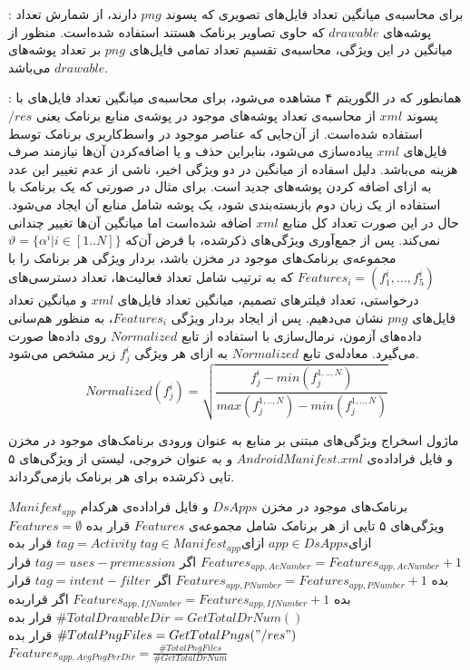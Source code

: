 : برای محاسبه‌ی میانگین تعداد فایل‌های تصویری که پسوند $png$ دارند، از شمارش تعداد پوشه‌های $drawable$ که حاوی تصاویر برنامک هستند استفاده شده‌است. منظور از میانگین در این ویژگی، محاسبه‌ی تقسیم تعداد تمامی فایل‌های $png$ بر تعداد پوشه‌های $drawable$ می‌باشد.

:  همانطور که در الگوریتم ۴ مشاهده می‌شود، برای محاسبه‌ی میانگین تعداد فایل‌های با پسوند $xml$ از محاسبه‌ی تعداد پوشه‌های موجود در پوشه‌ی منابع برنامک یعنی $/res$ استفاده شده‌است. از آن‌جایی که عناصر موجود در واسط‌کاربری برنامک توسط فایل‌های $xml$ پیاده‌سازی می‌شود، بنابراین حذف و یا اضافه‌کردن آن‌ها نیازمند صرف هزینه می‌باشد. دلیل اسفاده از میانگین در دو ویژگی اخیر، ناشی از عدم تغییر این عدد به ازای اضافه کردن پوشه‌های جدید است. برای مثال در صورتی که یک برنامک با استفاده از یک زبان دوم بازبسته‌بندی شود، یک پوشه‌ شامل منابع آن ایجاد می‌شود. حال در این صورت تعداد کل منابع $xml$ اضافه شده‌است اما میانگین آن‌ها تغییر چندانی نمی‌کند.
پس از جمع‌آوری ویژگی‌های ذکر‌شده، با فرض آن‌که $ \vartheta =\{\alpha^i | i \in [1..N]\}$
مجموعه‌ی برنامک‌های موجود در مخزن‌ باشد، بردار ویژگی هر برنامک را با 
$Features_{i} =(f^{i}_{1},...,f^{i}_{5})$
که به ترتیب شامل  تعداد فعالیت‌ها، تعداد دسترسی‌های درخواستی، تعداد فیلتر‌های تصمیم، میانگین تعداد فایل‌های $xml$ و میانگین تعداد فایل‌های $png$ نشان می‌دهیم. پس از ایجاد بردار ویژگی $Features_{i}$، به منظور هم‌سانی‌ داده‌های آزمون، نرمال‌سازی با استفاده از تابع $Normalized$ روی داده‌ها صورت می‌گیرد. معادله‌ی تابع $Normalized$ به ازای هر ویژگی $f^{i}_{j}$ زیر مشخص‌ می‌شود.\\
\begin{equation}
Normalized(f^{i}_{j})=\sqrt{\frac{f^{i}_{j}-min(f^{1,..,N}_{j})}{max(f^{1,..,N}_{j})-min(f^{1,..,N}_{j})}}
\end{equation}

ماژول اسخراج ویژگی‌های مبتنی بر منابع به عنوان ورودی برنامک‌های موجود در مخزن و فایل فراداده‌ی $AndroidManifest.xml$ و به عنوان خروجی، لیستی از ویژگی‌های ۵ تایی ذکرشده برای هر برنامک بازمی‌گرداند.



 برنامک‌های موجود در مخزن $DsApps$ و فایل فراداده‌ی هرکدام‌ $Manifest_{app}$
 ویژگی‌های ۵ تایی از هر برنامک شامل مجموعه‌ی $Features$
 قرار بده $Features=\emptyset$
‌ازای{$app \in  DsApps$} 
‌ازای{$tag \in Manifest_{app}$}
 $tag=Activity$
 قرار بده $Features_{app,AcNumber} =Features_{app,AcNumber} + 1 $
‌اگر
 $tag=uses-premession$
 قرار بده $Features_{app,PNumber} =Features_{app,PNumber} + 1 $
‌اگر
 $tag=intent-filter$
 قرار بده $Features_{app,IfNumber} =Features_{app,IfNumber} + 1 $
‌اگر
 قرار‌بده $\#TotalDrawableDir = GetTotalDrNum()$
 قرار بده $\#TotalPngFiles = GetTotalPngs("/res")$
 قرار بده $Features_{app,AvgPngPerDir}=  \frac{\#TotalPngFiles}{\#GetTotalDrNum}$


